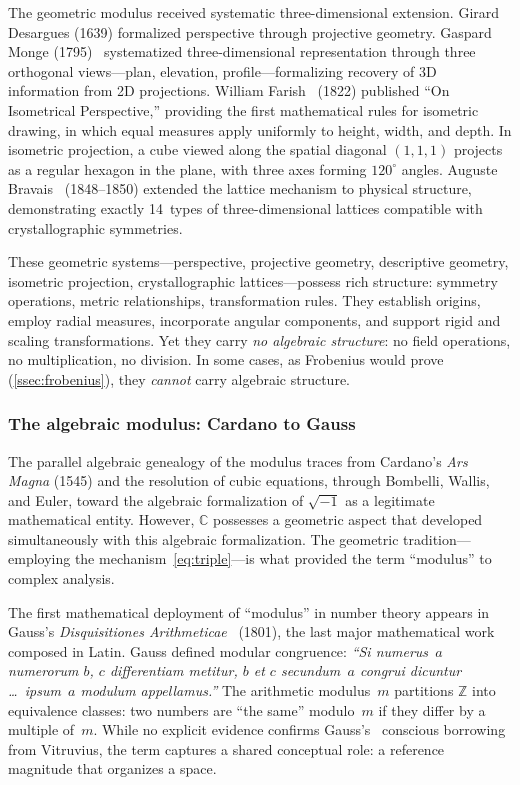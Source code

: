 The geometric modulus received systematic three-dimensional extension.
Girard Desargues (1639) formalized perspective through projective
geometry.  Gaspard Monge (1795)~\cite{monge1811geometrie} systematized three-dimensional
representation through three orthogonal views---plan, elevation,
profile---formalizing recovery of 3D information from 2D projections.
William Farish~\cite{farish22} (1822) published ``On Isometrical Perspective,''
providing the first mathematical rules for isometric drawing, in which
equal measures apply uniformly to height, width, and depth.  In
isometric projection, a cube viewed along the spatial diagonal $(1,1,1)$
projects as a regular hexagon in the plane, with three axes forming
$120^\circ$ angles.  Auguste Bravais~\cite{bravais48} (1848--1850) extended the lattice
mechanism to physical structure, demonstrating exactly 14~types of
three-dimensional lattices compatible with crystallographic symmetries.

These geometric systems---perspective, projective geometry, descriptive
geometry, isometric projection, crystallographic lattices---possess rich
structure: symmetry operations, metric relationships, transformation
rules.  They establish origins, employ radial measures, incorporate
angular components, and support rigid and scaling transformations.
Yet they carry \emph{no algebraic structure}: no field operations, no
multiplication, no division.  In some cases, as Frobenius would prove
(\cref{ssec:frobenius}), they \emph{cannot} carry algebraic structure.


\subsubsection{The algebraic modulus: Cardano to Gauss}

The parallel algebraic genealogy of the modulus traces from Cardano's
\emph{Ars Magna} (1545) and the resolution of cubic equations, through
Bombelli, Wallis, and Euler, toward the algebraic formalization of
$\sqrt{-1}$ as a legitimate mathematical entity.  However, $\mathbb{C}$
possesses a geometric aspect that developed simultaneously with this
algebraic formalization.  The geometric tradition---employing the
mechanism~\cref{eq:triple}---is what provided the term ``modulus'' to
complex analysis.

The first mathematical deployment of ``modulus'' in number theory
appears in Gauss's \emph{Disquisitiones Arithmeticae}~\cite{gauss1870disquisitiones} (1801), the last
major mathematical work composed in Latin.  Gauss defined modular
congruence: \emph{``Si numerus~$a$ numerorum $b$, $c$ differentiam
metitur, $b$ et $c$ secundum~$a$ congrui dicuntur \dots\ ipsum~$a$
modulum appellamus.''}  The arithmetic modulus~$m$ partitions
$\mathbb{Z}$ into equivalence classes: two numbers are ``the same''
modulo~$m$ if they differ by a multiple of~$m$.  While no explicit
evidence confirms Gauss's~\cite{gauss31} conscious borrowing from Vitruvius, the term
captures a shared conceptual role: a reference magnitude that organizes
a space.


